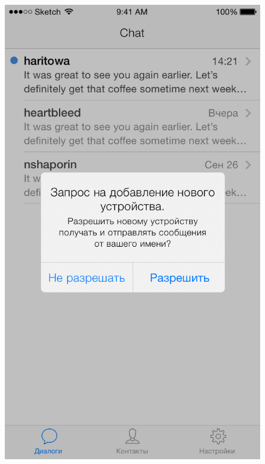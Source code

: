 \begin{figure}[h]
\begin{minipage}{.5\textwidth}
  \includegraphics[height=0.25\textheight]{inc/img/ui/add_new_device_notification.png}
  \label{sec:usage:deviceactivation:olddevice}
\end{minipage}
\end{figure}
